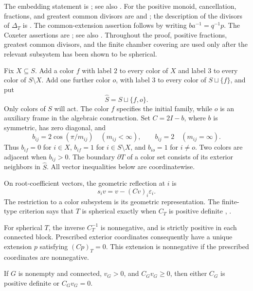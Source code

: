 The embedding statement is
\cite[Chapter~II, Section~4, Theorem~4.13(i)]{VanDerLek1983}; see also
\cite[Section~1, p.~2]{CharneyParis2014}.  For the positive monoid, cancellation,
fractions, and greatest common divisors are
\cite[Propositions~2.3, 4.2, and~5.5; Theorem~5.6]{BrieskornSaito1972}
and \cite[Theorem~4.14]{Deligne1972}; the description of the divisors
of $\Delta_T$ is
\cite[Lemma~5.4 and Propositions~5.5 and~5.7]{BrieskornSaito1972}.
The common-extension assertion follows by writing
$ba^{-1}=q^{-1}p$.  The Coxeter assertions are
\cite[Chapter~IV, \S1; Chapter~V, \S3, no.~3, and \S4,
nos.~4 and~6]{Bourbaki2002}; see also
\cite[Theorems~3.4.2(ii), 4.1.6(i), and Appendix~D]{Davis2008}.
Throughout the proof, positive fractions,
greatest common divisors, and the finite chamber covering are used
only after the relevant subsystem has been shown to be spherical.

Fix $X\subseteq S$.  Add a color $f$ with label $2$ to every color
of $X$ and label $3$ to every color of $S\setminus X$.  Add one
further color $o$, with label $3$ to every color of $S\sqcup\{f\}$,
and put
\[
 \widehat S=S\sqcup\{f,o\}.
\]
Only colors of $S$ will act.  The color $f$ specifies the initial
family, while $o$ is an auxiliary frame in the algebraic construction.
Set $C=2I-b$, where $b$ is symmetric, has zero diagonal, and
\[
 b_{ij}=2\cos(\pi/m_{ij})\quad(m_{ij}<\infty),
 \qquad b_{ij}=2\quad(m_{ij}=\infty).
\]
Thus $b_{if}=0$ for $i\in X$, $b_{if}=1$ for
$i\in S\setminus X$, and $b_{io}=1$ for $i\ne o$.
Two colors are adjacent when $b_{ij}>0$.  The boundary $\partial T$
of a color set consists of its exterior neighbors in $\widehat S$.
All vector inequalities below are coordinatewise.

On root-coefficient vectors, the geometric reflection at $i$ is
\begin{equation}
 s_i v=v-(Cv)_i\varepsilon_i.
 \label{cat:reflection}
\end{equation}
The restriction to a color subsystem is its geometric representation.
The finite-type criterion says that $T$ is spherical exactly when
$C_T$ is positive definite
\cite[Chapter~V, \S4, no.~8, Theorem~2]{Bourbaki2002},
\cite[Theorem~6.12.9]{Davis2008}.

\begin{lemma}
\label{cat:cartan}
For spherical $T$, the inverse $C_T^{-1}$ is nonnegative, and is
strictly positive in each connected block.  Prescribed exterior
coordinates consequently have a unique extension $p$ satisfying
$(Cp)_T=0$.  This extension is nonnegative if the prescribed
coordinates are nonnegative.

If $G$ is nonempty and connected, $v_G>0$, and $C_Gv_G\geq0$, then
either $C_G$ is positive definite or $C_Gv_G=0$.
\end{lemma}

